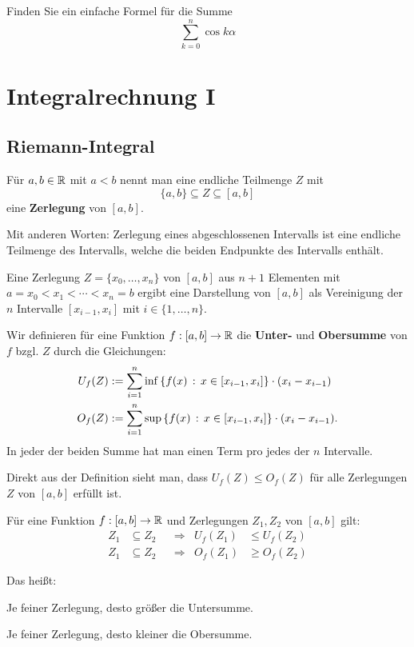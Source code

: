 \begin{aufg} 
	Finden Sie ein einfache Formel für die Summe
	\[
		\sum_{k=0}^n \cos k \alpha
	\]
\end{aufg} 

\chapter{Integralrechnung I} 

\section{Riemann-Integral} 


\begin{defn} 
	Für $a, b \in \mathbb{R}$ mit $a<b$ nennt man eine endliche Teilmenge $Z$ mit \[
		\{a,b\} \subseteq Z \subseteq [a,b]
	\] eine \textbf{Zerlegung} von $[a,b]$. 
	
	Mit anderen Worten: Zerlegung eines abgeschlossenen Intervalls ist eine endliche Teilmenge des Intervalls, welche die beiden Endpunkte des Intervalls enthält. 
\end{defn} 


\begin{defn}
	Eine Zerlegung $Z = \{x_0,\ldots, x_n\}$ von $[a,b]$ aus $n+1$ Elementen mit $a = x_0 < x_1 < \cdots < x_n = b$ ergibt eine Darstellung von $[a,b]$ als Vereinigung der $n$ Intervalle $[x_{i-1},x_i]$ mit $i \in \{1,\ldots, n\}$.
	
 	Wir definieren für eine Funktion $f: [a,b] \to \mathbb{R}$ die \textbf{Unter-} und \textbf{Obersumme} von $f$ bzgl. $Z$ durch die Gleichungen: 
 	\begin{align*}
 		U_f(Z) & := \sum_{i=1}^n  \inf \left\{ f(x) \,:\, x \in [x_{i-1},x_i] \right\} \cdot (x_i - x_{i-1})
 		\\ O_f(Z) & := \sum_{i=1}^n \sup \left\{ f(x) \,:\, x \in [x_{i-1},x_i] \right\} \cdot (x_i - x_{i-1}).
 	\end{align*}  
 	In jeder der beiden Summe hat man einen Term pro jedes der $n$ Intervalle. 
\end{defn} 

\begin{defn}
	Direkt aus der Definition sieht man, dass $U_f(Z) \le O_f(Z)$ für alle Zerlegungen $Z$ von $[a,b]$ erfüllt ist. 
\end{defn} 

\begin{bem}[Verfeinerung] 
		Für eine Funktion $f : [a,b] \to \mathbb{R}$ und Zerlegungen $Z_1, Z_2$ von $[a,b]$ gilt: 
		\begin{align*}
			Z_1 & \subseteq Z_2 & & \Longrightarrow & U_f(Z_1) & \le U_f(Z_2)
			\\ Z_1 & \subseteq Z_2 & & \Longrightarrow & O_f(Z_1) & \ge O_f(Z_2)
		\end{align*} 
		
		Das heißt: 
		\begin{enuma} 
			\item Je feiner Zerlegung, desto größer die Untersumme. 
			\item Je feiner Zerlegung, desto kleiner die Obersumme. 
		\end{enuma} 
\end{bem} 

